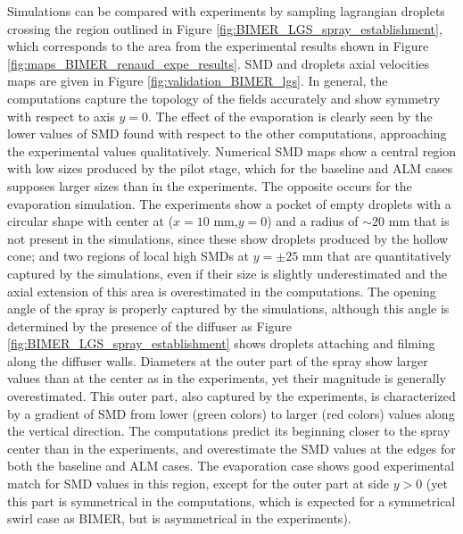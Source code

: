 Simulations can be compared with experiments by sampling lagrangian droplets crossing the region outlined in Figure \ref{fig:BIMER_LGS_spray_establishment}, which corresponds to the area from the experimental results shown in Figure \ref{fig:maps_BIMER_renaud_expe_results}. SMD and droplets axial velocities maps are given in Figure \ref{fig:validation_BIMER_lgs}. In general, the computations capture the topology of the fields accurately and show symmetry with respect to axis $y = 0$. The effect of the evaporation is clearly seen by the lower values of SMD found with respect to the other computations, approaching the experimental values qualitatively. Numerical SMD maps show a central region with low sizes produced by the pilot stage, which for the baseline and ALM cases supposes larger sizes than in the experiments. The opposite occurs for the evaporation simulation. The experiments show a pocket of empty droplets with a circular shape with center at ($x = 10$ mm,$y = 0$) and a radius of $\sim 20$ mm that is not present in the simulations, since these show droplets produced by the hollow cone; and two regions of local high SMDs at $y = \pm 25$ mm that are quantitatively captured by the simulations, even if their size is slightly underestimated and the axial extension of this area is overestimated in the computations. The opening angle of the spray is properly captured by the simulations, although this angle is determined by the presence of the diffuser as Figure \ref{fig:BIMER_LGS_spray_establishment} shows droplets attaching and filming along the diffuser walls. Diameters at the outer part of the spray show larger values than at the center as in the experiments, yet their magnitude is generally overestimated. This outer part, also captured by the experiments, is characterized by a gradient of SMD from lower (green colors) to larger (red colors) values along the vertical direction. The computations predict its beginning closer to the spray center than in the experiments, and overestimate the SMD values at the edges for both the baseline and ALM cases. The evaporation case shows good experimental match for SMD values in this region, except for the outer part at side $y > 0$ (yet this part is symmetrical in the computations, which is expected for a symmetrical swirl case as BIMER, but is asymmetrical in the experiments). 



